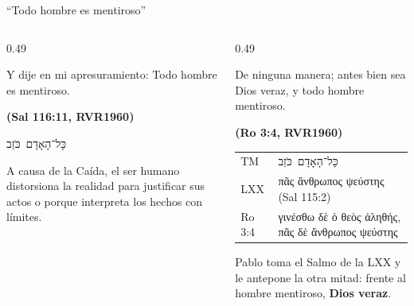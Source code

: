 \documentclass[hyperref={bookmarks=false},aspectratio=169]{beamer}
\newcommand{\heb}[1]{\mbox{\foreignlanguage{hebrew}{#1}}}
\newcommand{\grc}[1]{\foreignlanguage{ancientgreek}{#1}}
\newcommand{\fuente}[1]{\par\hfill{\upshape\bfseries\footnotesize\textcolor{azul}{#1}}}
\newcommand{\destacar}[1]{\textbf{\textcolor{azul}{#1}}}
\begin{document}
\begin{frame}{``Todo hombre es mentiroso''}
\begin{columns}[t,onlytextwidth]
\begin{column}{0.49\textwidth}
\begin{cita}Y dije en mi apresuramiento: Todo hombre es mentiroso.\fuente{(Sal 116:11, RVR1960)}\end{cita}
\begin{center}\heb{כָּל־הָאָדָם כֹּזֵב}\end{center}
\small A causa de la Caída, el ser humano distorsiona la realidad para justificar sus actos o porque interpreta los hechos con límites.
\end{column}
\begin{column}{0.49\textwidth}
\begin{cita}De ninguna manera; antes bien sea Dios veraz, y todo hombre mentiroso.\fuente{(Ro 3:4, RVR1960)}\end{cita}
\scriptsize\renewcommand{\arraystretch}{1.12}
\begin{tabular}{@{}>{\RaggedRight\arraybackslash}p{1.2cm}>{\RaggedRight\arraybackslash}p{4.4cm}@{}}
\toprule
TM & \heb{כָּל־הָאָדָם כֹּזֵב} \\
LXX & \grc{πᾶς ἄνθρωπος ψεύστης} (Sal 115:2) \\
Ro 3:4 & \grc{γινέσθω δὲ ὁ θεὸς ἀληθής, πᾶς δὲ ἄνθρωπος ψεύστης} \\
\bottomrule
\end{tabular}\par\smallskip
Pablo toma el Salmo de la LXX y le antepone la otra mitad: frente al hombre mentiroso, \destacar{Dios veraz}.
\end{column}
\end{columns}
\end{frame}
\end{document}

